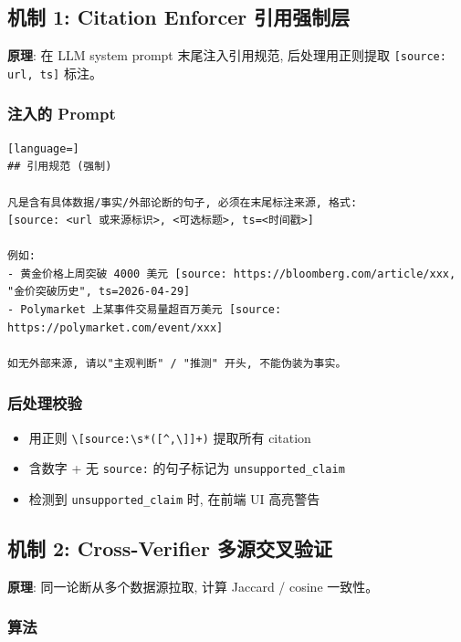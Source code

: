\subsection{机制 1: Citation Enforcer 引用强制层}

\textbf{原理}: 在 LLM system prompt 末尾注入引用规范, 后处理用正则提取 \texttt{[source: url, ts]} 标注。

\subsubsection{注入的 Prompt}

\begin{lstlisting}[language=]
## 引用规范 (强制)

凡是含有具体数据/事实/外部论断的句子, 必须在末尾标注来源, 格式:
[source: <url 或来源标识>, <可选标题>, ts=<时间戳>]

例如:
- 黄金价格上周突破 4000 美元 [source: https://bloomberg.com/article/xxx, "金价突破历史", ts=2026-04-29]
- Polymarket 上某事件交易量超百万美元 [source: https://polymarket.com/event/xxx]

如无外部来源, 请以"主观判断" / "推测" 开头, 不能伪装为事实。
\end{lstlisting}

\subsubsection{后处理校验}

\begin{itemize}
    \item 用正则 \texttt{\textbackslash{}[source:\textbackslash{}s*([\textasciicircum,\textbackslash{}]]+)} 提取所有 citation
    \item 含数字 + 无 \texttt{source:} 的句子标记为 \texttt{unsupported\_claim}
    \item 检测到 \texttt{unsupported\_claim} 时, 在前端 UI 高亮警告
\end{itemize}

\subsection{机制 2: Cross-Verifier 多源交叉验证}

\textbf{原理}: 同一论断从多个数据源拉取, 计算 Jaccard / cosine 一致性。

\subsubsection{算法}

